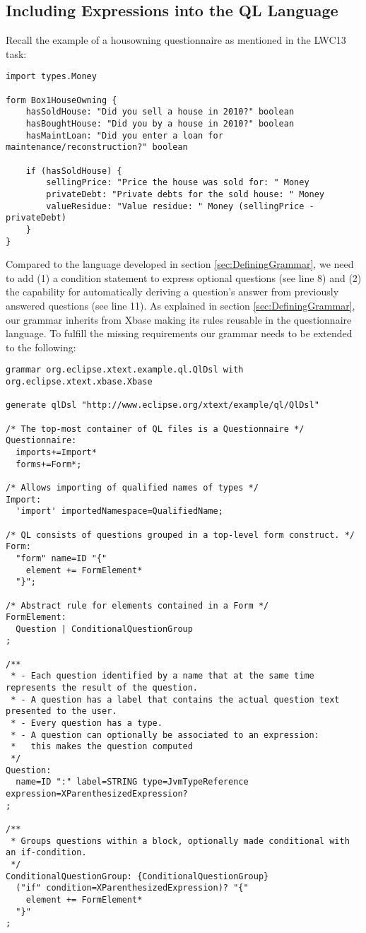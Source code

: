 \subsection{Including Expressions into the QL Language}

Recall the example of a housowning questionnaire as mentioned in the LWC13 task:

\begin{lstlisting}[language=QL]
import types.Money

form Box1HouseOwning {
	hasSoldHouse: "Did you sell a house in 2010?" boolean
	hasBoughtHouse: "Did you by a house in 2010?" boolean
	hasMaintLoan: "Did you enter a loan for maintenance/reconstruction?" boolean
	
	if (hasSoldHouse) {
		sellingPrice: "Price the house was sold for: " Money 
		privateDebt: "Private debts for the sold house: " Money
		valueResidue: "Value residue: " Money (sellingPrice - privateDebt) 
	}
}
\end{lstlisting}

Compared to the language developed in section \ref{sec:DefiningGrammar}, we need to add (1) a condition
statement to express optional questions (see line 8) and (2) the capability for automatically 
deriving a question's answer from previously answered questions (see line 11). As explained in section
\ref{sec:DefiningGrammar}, our grammar inherits from Xbase making its rules reusable in the 
questionnaire language. To fulfill the missing requirements our grammar needs to be extended to the following:

\begin{lstlisting}[language=Xtext]
grammar org.eclipse.xtext.example.ql.QlDsl with org.eclipse.xtext.xbase.Xbase

generate qlDsl "http://www.eclipse.org/xtext/example/ql/QlDsl"

/* The top-most container of QL files is a Questionnaire */
Questionnaire:
  imports+=Import*
  forms+=Form*;

/* Allows importing of qualified names of types */
Import:
  'import' importedNamespace=QualifiedName;

/* QL consists of questions grouped in a top-level form construct. */
Form:
  "form" name=ID "{"
    element += FormElement*
  "}";

/* Abstract rule for elements contained in a Form */
FormElement:
  Question | ConditionalQuestionGroup
;

/**
 * - Each question identified by a name that at the same time represents the result of the question.
 * - A question has a label that contains the actual question text presented to the user.
 * - Every question has a type.
 * - A question can optionally be associated to an expression:
 *   this makes the question computed
 */
Question:
  name=ID ":" label=STRING type=JvmTypeReference expression=XParenthesizedExpression?
;

/**
 * Groups questions within a block, optionally made conditional with an if-condition.
 */
ConditionalQuestionGroup: {ConditionalQuestionGroup}
  ("if" condition=XParenthesizedExpression)? "{"
    element += FormElement*
  "}"
;
\end{lstlisting}

